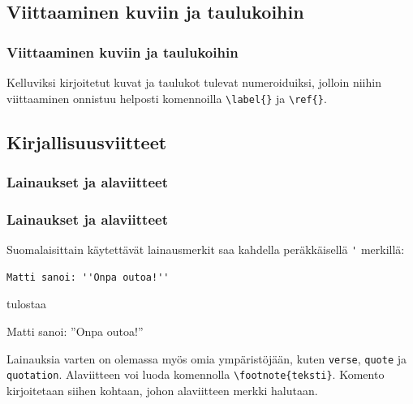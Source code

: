 \subsection{Viittaaminen kuviin ja taulukoihin}
\begin{frame}[fragile]
    \frametitle{Viittaaminen kuviin ja taulukoihin}
    Kelluviksi kirjoitetut kuvat ja taulukot tulevat numeroiduiksi, jolloin niihin viittaaminen onnistuu helposti komennoilla \verb-\label{}- ja \verb-\ref{}-. 
    
    
\end{frame}
\subsection{Kirjallisuusviitteet}
\subsubsection{Lainaukset ja alaviitteet}
\begin{frame}[fragile]
    \frametitle{Lainaukset ja alaviitteet}
    Suomalaisittain käytettävät lainausmerkit saa kahdella peräkkäisellä \verb-'- merkillä:
    \begin{Verbatim}[frame=single]
Matti sanoi: ''Onpa outoa!''
    \end{Verbatim}
    tulostaa
    \begin{sample}
        Matti sanoi: ''Onpa outoa!''
    \end{sample}
    Lainauksia varten on olemassa myös omia ympäristöjään, kuten \verb-verse-, \verb-quote- ja \verb-quotation-.
    \vaihto
    Alaviitteen voi luoda komennolla \verb-\footnote{teksti}-. Komento kirjoitetaan siihen kohtaan, johon alaviitteen merkki halutaan. 
\end{frame}
\begin{frame}[fragile]
    
    
\end{frame}
